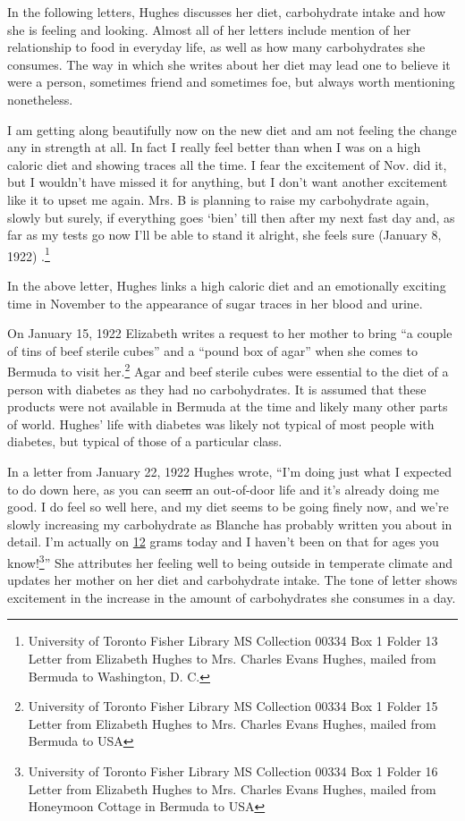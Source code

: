 \documentclass[12pt]{article}
\begin{document}
In the following letters, Hughes discusses her diet, carbohydrate intake and how she is feeling and looking. Almost all of her letters include mention of her relationship to food in everyday life, as well as how many carbohydrates she consumes. The way in which she writes about her diet may lead one to believe it were a person, sometimes friend and sometimes foe, but always worth mentioning nonetheless. 

\begin{singlespace}
I am getting along beautifully now on the new diet and am not feeling the change any in strength at all. In fact I really feel better than when I was on a high caloric diet and showing traces all the time. I fear the excitement of Nov. did it, but I wouldn't have missed it for anything, but I don't want another excitement like it to upset me again. Mrs. B is planning to raise my carbohydrate again, slowly but surely, if everything goes `bien' till then after my next fast day and, as far as my tests go now I'll be able to stand it alright, she feels sure (January 8, 1922) \citep{hughes_papers}.\footnote{University of Toronto Fisher Library MS Collection 00334 Box 1 Folder 13 Letter from Elizabeth Hughes to Mrs. Charles Evans Hughes, mailed from Bermuda to Washington, D. C.}
\end{singlespace}
In the above letter, Hughes links a high caloric diet and an emotionally exciting time in November to the appearance of sugar traces in her blood and urine. 

On January 15, 1922 Elizabeth writes a request to her mother to bring ``a couple of tins of beef sterile cubes'' and a ``pound box of agar'' when she comes to Bermuda to visit her.\footnote{University of Toronto Fisher Library MS Collection 00334
Box 1 Folder 15 Letter from Elizabeth Hughes to Mrs. Charles Evans Hughes, mailed from Bermuda to USA} Agar and beef sterile cubes were essential to the diet of a person with diabetes as they had no carbohydrates. It is assumed that these products were not available in Bermuda at the time and likely many other parts of world. Hughes' life with diabetes was likely not typical of most people with diabetes, but typical of those of a particular class. 



In a letter from January 22, 1922 Hughes wrote, ``I'm doing just what I expected to do down here, as you can see\st{m} an out-of-door life and it's already doing me good. I do feel so well here, and my diet seems to be going finely now, and we're slowly increasing my carbohydrate as Blanche has probably written you about in detail. I'm actually on \underline{12} grams today and I haven't been on that for ages you know!\footnote{University of Toronto Fisher Library MS Collection 00334 Box 1 Folder 16 Letter from Elizabeth Hughes to Mrs. Charles Evans Hughes, mailed from Honeymoon Cottage in Bermuda to USA}'' She attributes her feeling well to being outside in temperate climate and updates her mother on her diet and carbohydrate intake. The tone of letter shows excitement in the increase in the amount of carbohydrates she consumes in a day. 
\end{document}
